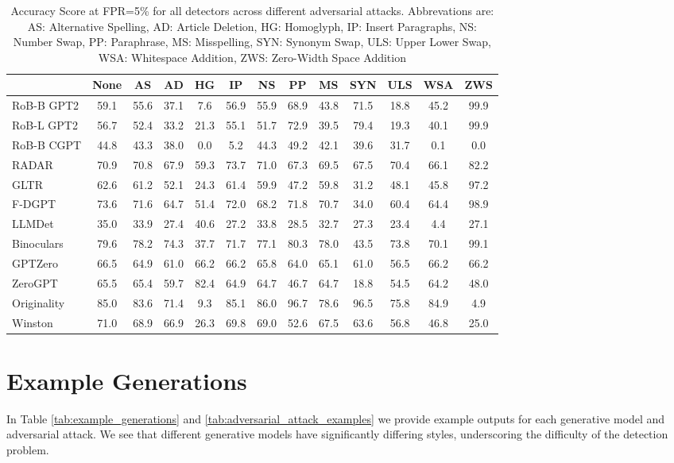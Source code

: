 \documentclass[11pt]{article}
\begin{document}
\begin{table}[t]
    \small
    \centering
    \begin{tabular}{l|c|c|c|c|c|c|c|c|c|c|c|c}
    \toprule
    &\textbf{None}&\textbf{AS}&\textbf{AD}&\textbf{HG}&\textbf{IP}&\textbf{NS}&\textbf{PP}&\textbf{MS}&\textbf{SYN}&\textbf{ULS}&\textbf{WSA}&\textbf{ZWS}\\
    \midrule
    RoB-B GPT2&59.1&55.6&37.1&7.6&56.9&55.9&68.9&43.8&71.5&18.8&45.2&99.9\\
    RoB-L GPT2&56.7&52.4&33.2&21.3&55.1&51.7&72.9&39.5&79.4&19.3&40.1&99.9\\
    RoB-B CGPT&44.8&43.3&38.0&0.0&5.2&44.3&49.2&42.1&39.6&31.7&0.1&0.0\\
    RADAR&70.9&70.8&67.9&59.3&73.7&71.0&67.3&69.5&67.5&70.4&66.1&82.2\\
    \midrule
    GLTR&62.6&61.2&52.1&24.3&61.4&59.9&47.2&59.8&31.2&48.1&45.8&97.2\\
    F-DGPT&73.6&71.6&64.7&51.4&72.0&68.2&71.8&70.7&34.0&60.4&64.4&98.9\\
    LLMDet&35.0&33.9&27.4&40.6&27.2&33.8&28.5&32.7&27.3&23.4&4.4&27.1\\
    Binoculars&79.6&78.2&74.3&37.7&71.7&77.1&80.3&78.0&43.5&73.8&70.1&99.1\\
    \midrule
    GPTZero&66.5&64.9&61.0&66.2&66.2&65.8&64.0&65.1&61.0&56.5&66.2&66.2\\
    ZeroGPT&65.5&65.4&59.7&82.4&64.9&64.7&46.7&64.7&18.8&54.5&64.2&48.0\\
    Originality&85.0&83.6&71.4&9.3&85.1&86.0&96.7&78.6&96.5&75.8&84.9&4.9\\
    Winston&71.0&68.9&66.9&26.3&69.8&69.0&52.6&67.5&63.6&56.8&46.8&25.0\\
    \bottomrule
    \end{tabular}
    \caption{Accuracy Score at FPR=5\% for all detectors across different adversarial attacks. Abbrevations are: AS: Alternative Spelling, AD: Article Deletion, HG: Homoglyph, IP: Insert Paragraphs, NS: Number Swap, PP: Paraphrase, MS: Misspelling, SYN: Synonym Swap, ULS: Upper Lower Swap, WSA: Whitespace Addition, ZWS: Zero-Width Space Addition}
    \label{tab:adversarial_results}
\end{table}

\section{Example Generations}
\label{app:examples}
In Table \ref{tab:example_generations} and \ref{tab:adversarial_attack_examples} we provide example outputs for each generative model and adversarial attack. We see that different generative models have significantly differing styles, underscoring the difficulty of the detection problem.
\end{document}

